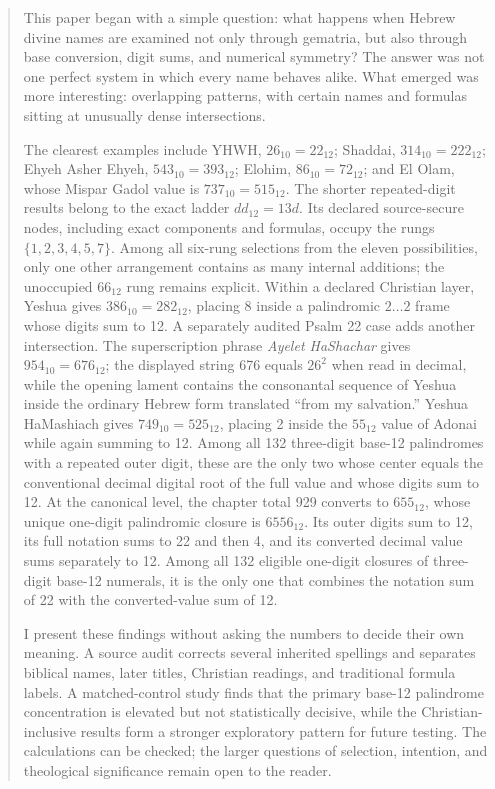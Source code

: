 \begin{abstract}
This paper began with a simple question: what happens when Hebrew divine names are examined not only through gematria, but also through base conversion, digit sums, and numerical symmetry? The answer was not one perfect system in which every name behaves alike. What emerged was more interesting: overlapping patterns, with certain names and formulas sitting at unusually dense intersections.

The clearest examples include YHWH, $26_{10}=22_{12}$; Shaddai, $314_{10}=222_{12}$; Ehyeh Asher Ehyeh, $543_{10}=393_{12}$; Elohim, $86_{10}=72_{12}$; and El Olam, whose Mispar Gadol value is $737_{10}=515_{12}$. The shorter repeated-digit results belong to the exact ladder $dd_{12}=13d$. Its declared source-secure nodes, including exact components and formulas, occupy the rungs $\{1,2,3,4,5,7\}$. Among all six-rung selections from the eleven possibilities, only one other arrangement contains as many internal additions; the unoccupied $66_{12}$ rung remains explicit. Within a declared Christian layer, Yeshua gives $386_{10}=282_{12}$, placing 8 inside a palindromic $2\ldots2$ frame whose digits sum to 12. A separately audited Psalm 22 case adds another intersection. The superscription phrase \textit{Ayelet HaShachar} gives $954_{10}=676_{12}$; the displayed string 676 equals $26^2$ when read in decimal, while the opening lament contains the consonantal sequence of Yeshua inside the ordinary Hebrew form translated ``from my salvation.'' Yeshua HaMashiach gives $749_{10}=525_{12}$, placing 2 inside the $55_{12}$ value of Adonai while again summing to 12. Among all 132 three-digit base-12 palindromes with a repeated outer digit, these are the only two whose center equals the conventional decimal digital root of the full value and whose digits sum to 12. At the canonical level, the chapter total 929 converts to $655_{12}$, whose unique one-digit palindromic closure is $6556_{12}$. Its outer digits sum to 12, its full notation sums to 22 and then 4, and its converted decimal value sums separately to 12. Among all 132 eligible one-digit closures of three-digit base-12 numerals, it is the only one that combines the notation sum of 22 with the converted-value sum of 12.

I present these findings without asking the numbers to decide their own meaning. A source audit corrects several inherited spellings and separates biblical names, later titles, Christian readings, and traditional formula labels. A matched-control study finds that the primary base-12 palindrome concentration is elevated but not statistically decisive, while the Christian-inclusive results form a stronger exploratory pattern for future testing. The calculations can be checked; the larger questions of selection, intention, and theological significance remain open to the reader.
\end{abstract}
